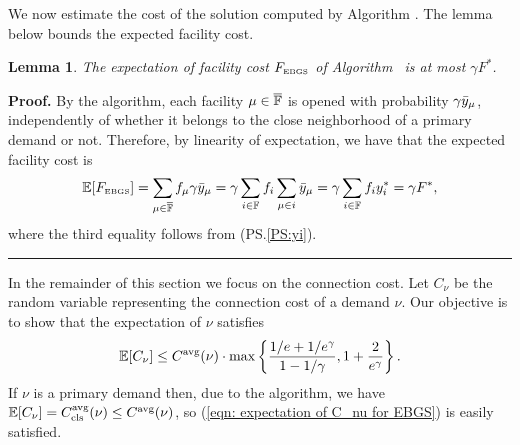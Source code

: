 \documentclass[oneside,final]{ucr}
\newtheorem{lemma}[theorem]{Lemma}
\newenvironment{proof}[1][Proof]{\textbf{#1.} }{\ \rule{0.5em}{0.5em}}
\begin{document}
\medskip

We now estimate the cost of the solution computed by Algorithm {\EBGS}. The lemma
below bounds the expected facility cost.


\begin{lemma} \label{lem: EBGS facility cost}
The expectation of facility cost $F_{\mbox{\tiny\rm EBGS}}$ of Algorithm~{\EBGS} is at most $\gamma F^\ast$.
\end{lemma}

\begin{proof}
By the algorithm, each facility $\mu\in \overline{\mathbb{F}}$ is opened with
probability $\gamma {\bar y}_{\mu}$, independently of whether it belongs to the
close neighborhood of a primary demand or not. Therefore, by
  linearity of expectation, we have that the expected facility cost is
%
\begin{equation*}
	\mathbb{E}[F_{\mbox{\tiny\rm EBGS}}] = \sum_{\mu \in \overline{\mathbb{F}}} f_\mu \gamma {\bar y}_{\mu} 
			= \gamma \sum_{i\in \mathbb{F}} f_i \sum_{\mu\in i} {\bar y}_{\mu} 
			= \gamma \sum_{i \in \mathbb{F}} f_i y_i^\ast = \gamma F^\ast,
\end{equation*}
%
where the third equality follows from (PS.\ref{PS:yi}).
\end{proof}


\medskip

In the remainder of this section we focus on the connection cost. Let $C_{\nu}$ be the
random variable representing the connection cost of a demand $\nu$. Our objective is
to show that the expectation of $\nu$ satisfies
%
\begin{equation}
\mathbb{E}[C_\nu]	\leq C^{{\mbox{\scriptsize\rm avg}}}(\nu) \cdot \max\left\{\frac{1/e+1/e^\gamma}{1-1/\gamma}, 1 + \frac{2}{e^\gamma}\right\}.
		\label{eqn: expectation of C_nu for EBGS}
\end{equation}
%
If $\nu$ is a primary demand then, due to the algorithm, we have $\mathbb{E}[C_{\nu}] =
C_{{\mbox{\scriptsize\rm cls}}}^{{\mbox{\scriptsize\rm avg}}}(\nu) \le C^{{\mbox{\scriptsize\rm avg}}}(\nu)$, so (\ref{eqn: expectation of C_nu for EBGS}) is
easily satisfied.
\end{document}
